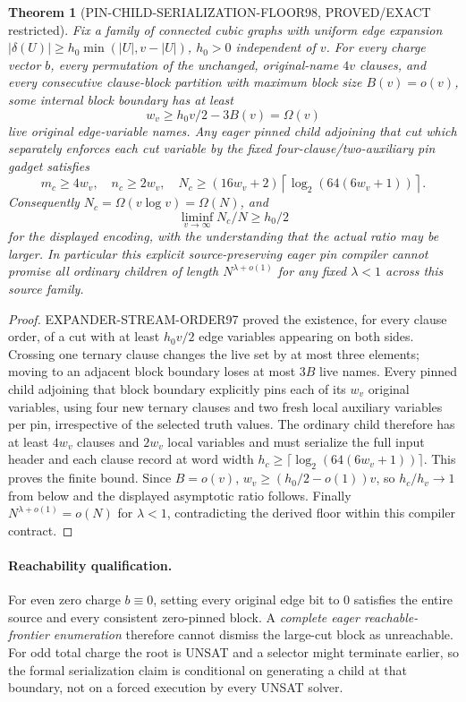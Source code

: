 \documentclass[11pt]{article}
\newtheorem{theorem}{Theorem}
\begin{document}
\begin{theorem}[PIN-CHILD-SERIALIZATION-FLOOR98, PROVED/EXACT restricted]
Fix a family of connected cubic graphs with uniform edge expansion
$|\delta(U)|\ge h_0\min(|U|,v-|U|)$, $h_0>0$ independent of $v$.
For every charge vector $b$, every permutation of the \emph{unchanged, original-name} $4v$ clauses, and every consecutive clause-block partition with maximum block size $B(v)=o(v)$, some internal block boundary has at least
\[
w_v\ge h_0v/2-3B(v)=\Omega(v)
\]
live original edge-variable names. Any eager pinned child adjoining that cut which separately enforces each cut variable by the fixed four-clause/two-auxiliary pin gadget satisfies
\[
m_c\ge4w_v,\quad n_c\ge2w_v,\quad
N_c\ge(16w_v+2)\left\lceil\log_2(64(6w_v+1))\right\rceil.
\]
Consequently $N_c=\Omega(v\log v)=\Omega(N)$, and
\[
\liminf_{v\to\infty}N_c/N\ge h_0/2
\]
for the displayed encoding, with the understanding that the actual ratio may be larger. In particular \emph{this explicit source-preserving eager pin compiler} cannot promise all ordinary children of length $N^{\lambda+o(1)}$ for any fixed $\lambda<1$ across this source family.
\end{theorem}
\begin{proof}
EXPANDER-STREAM-ORDER97 proved the existence, for every clause order, of a cut with at least $h_0v/2$ edge variables appearing on both sides. Crossing one ternary clause changes the live set by at most three elements; moving to an adjacent block boundary loses at most $3B$ live names. Every pinned child adjoining that block boundary explicitly pins each of its $w_v$ original variables, using four new ternary clauses and two fresh local auxiliary variables per pin, irrespective of the selected truth values. The ordinary child therefore has at least $4w_v$ clauses and $2w_v$ local variables and must serialize the full input header and each clause record at word width $h_c\ge\lceil\log_2(64(6w_v+1))\rceil$. This proves the finite bound. Since $B=o(v)$, $w_v\ge(h_0/2-o(1))v$, so $h_c/h_v\to1$ from below and the displayed asymptotic ratio follows. Finally $N^{\lambda+o(1)}=o(N)$ for $\lambda<1$, contradicting the derived floor within this compiler contract.
\end{proof}

\paragraph{Reachability qualification.}
For even zero charge $b\equiv0$, setting every original edge bit to 0 satisfies the entire source and every consistent zero-pinned block. A \emph{complete eager reachable-frontier enumeration} therefore cannot dismiss the large-cut block as unreachable. For odd total charge the root is UNSAT and a selector might terminate earlier, so the formal serialization claim is conditional on generating a child at that boundary, not on a forced execution by every UNSAT solver.
\end{document}

